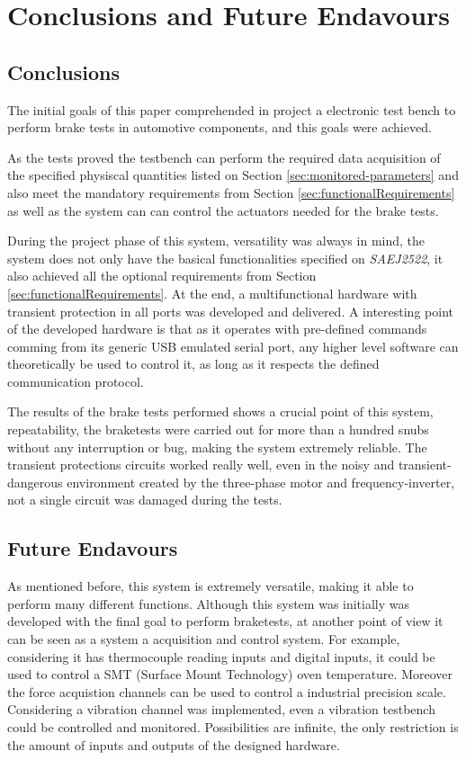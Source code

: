 \chapter{Conclusions and Future Endavours}\label{ch:conclusions-and-future-endavours}
	
	\section{Conclusions}\label{sec:conclusions}

		The initial goals of this paper comprehended in project a electronic test bench to perform brake tests in automotive components, and this goals were achieved.
		\par
		As the tests proved the testbench can perform the required data acquisition of the specified physiscal quantities listed on Section \ref{sec:monitored-parameters} and also meet the mandatory requirements from Section \ref{sec:functionalRequirements} as well as the system can can control the actuators needed for the brake tests.
		\par
		During the project phase of this system, versatility was always in mind, the system does not only have the basical functionalities specified on \textit{SAEJ2522}, it also achieved all the optional requirements from Section \ref{sec:functionalRequirements}. At the end, a multifunctional hardware with transient protection in all ports was developed and delivered. A interesting point of the developed hardware is that as it operates with pre-defined commands comming from its generic USB emulated serial port, any higher level software can theoretically be used to control it, as long as it respects the defined communication protocol.
		\par
		The results of the brake tests performed shows a crucial point of this system, repeatability, the braketests were carried out for more than a hundred snubs without any interruption or bug, making the system extremely reliable. The transient protections circuits worked really well, even in the noisy and transient-dangerous environment created by the three-phase motor and frequency-inverter, not a single circuit was damaged during the tests.

	\section{Future Endavours}\label{sec:future-endavours}

		As mentioned before, this system is extremely versatile, making it able to perform many different functions. Although this system was initially was developed with the final goal to perform braketests, at another point of view it can be seen as a system a acquisition and control system. For example, considering it has thermocouple reading inputs and digital inputs, it could be used to control a SMT (Surface Mount Technology) oven temperature. Moreover the force acquistion channels can be used to control a industrial precision scale. Considering a vibration channel was implemented, even a vibration testbench could be controlled and monitored. Possibilities are infinite, the only restriction is the amount of inputs and outputs of the designed hardware.